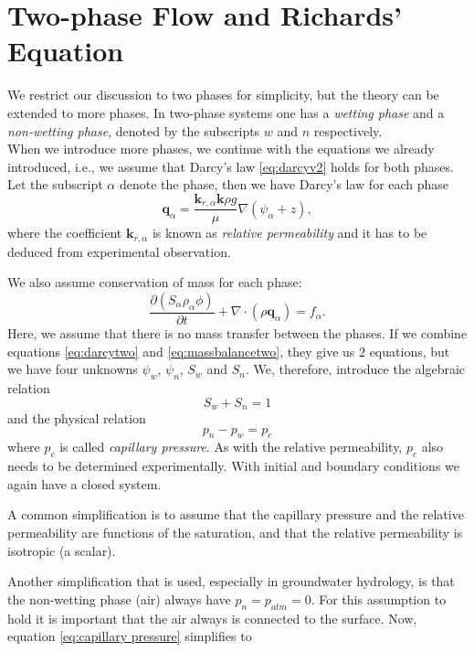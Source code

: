 \documentclass[../Main/main.tex]{subfiles}
\begin{document}
\section{Two-phase Flow and Richards' Equation}
\label{sec:TwoPhase}

We restrict our discussion to two phases for simplicity, but the theory can be extended to more phases. In two-phase systems one has a \emph{wetting phase} and a \emph{non-wetting phase}, denoted by the subscripts $w$ and $n$ respectively. \\
When we introduce more phases, we continue with the equations we already introduced, i.e., we assume that Darcy's law  \eqref{eq:darcyv2} holds for both phases. Let the subscript $\alpha$ denote the phase, then we have Darcy's law for each phase
\begin{equation}\label{eq:darcytwo}
	\bm{q}_{\alpha} = \frac{\bm{k}_{r,\alpha}\bm{k}\rho g}{\mu}\nabla(\psi_{\alpha} + z),
\end{equation}
where the coefficient $\bm{k}_{r,\alpha}$ is known as \emph{relative permeability} and it has to be deduced from experimental observation. \par We also assume conservation of mass for each phase:
\begin{equation}\label{eq:massbalancetwo}
	\frac{\partial (S_{\alpha}\rho_{\alpha} \phi) }{\partial t} + \nabla \cdot (\rho \bm{q}_{\alpha}) = f_{\alpha}.
\end{equation}
Here, we assume that there is no mass transfer between the phases.
If we combine equations \eqref{eq:darcytwo} and \eqref{eq:massbalancetwo}, they give us $2$ equations, but we have four unknowns $\psi_w$, $\psi_n$, $S_w$ and $S_n$. We, therefore, introduce the algebraic relation
\begin{equation*}
	S_w + S_n = 1
\end{equation*}
and the physical relation
\begin{equation}\label{eq:capillary pressure}
	p_n-p_w = p_c
\end{equation}
where $p_c$ is called \emph{capillary pressure}. As with the relative permeability, $p_c$ also needs to be determined experimentally.
With initial and boundary conditions we again have a closed system.\par
A common simplification is to assume that the capillary pressure and the relative permeability are functions of the saturation, and that the relative permeability is isotropic (a scalar). \par
Another simplification that is used, especially in groundwater hydrology, is that the non-wetting phase (air) always have $p_n = p_{atm}=0$. For this assumption to hold it is important that the air always is connected to the surface. Now, equation \eqref{eq:capillary pressure} simplifies to
\end{document}
